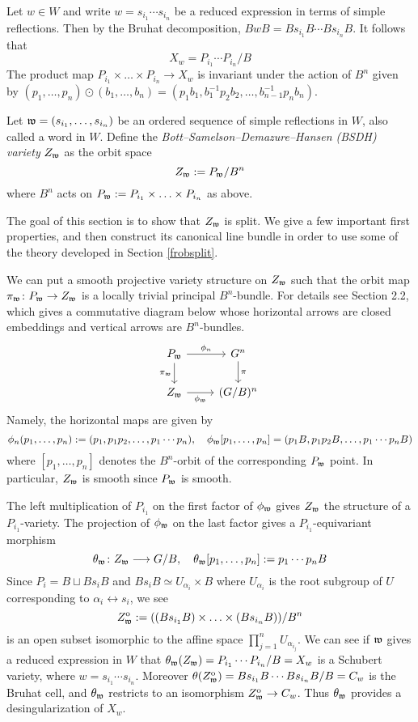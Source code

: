 \documentclass[12pt]{article}
\begin{document}
Let $w \in W$ and write $w = s_{i_1}\cdots s_{i_n}$ be a reduced expression in terms of simple reflections. Then by the Bruhat decomposition, $BwB = Bs_{i_1}B\cdots Bs_{i_n}B$. It follows that
\[X_w = P_{i_1}\cdots P_{i_n}/B\]
The product map $P_{i_1} \times \ldots \times P_{i_n} \to X_w$ is invariant under the action of $B^n$ given by $(p_1,\ldots,p_n) \odot (b_1,\ldots,b_n) = (p_1 b_1, b_1^{-1} p_2 b_2, \ldots, b_{n-1}^{-1} p_n b_n)$.
\begin{defn}
    Let $\mathfrak{w} = (s_{i_1},\ldots,s_{i_n})$ be an ordered sequence of simple reflections in $W$, also called a word in $W$. Define the \textit{Bott–Samelson–Demazure–Hansen (BSDH) variety} $Z_{\mathfrak{w}}$ as the orbit space
    \[Z_{\mathfrak{w}} := P_{\mathfrak{w}}/B^n\]
    where $B^n$ acts on $P_{\mathfrak{w}} := P_{i_1} \times \ldots \times P_{i_n}$ as above.
\end{defn}
The goal of this section is to show that $Z_{\mathfrak{w}}$ is split. We give a few important first properties, and then construct its canonical line bundle in order to use some of the theory developed in Section \ref{frobsplit}.

We can put a smooth projective variety structure on $Z_{\mathfrak{w}}$ such that the orbit map $\pi_{\mathfrak{w}} \colon P_{\mathfrak{w}} \to Z_{\mathfrak{w}}$ is a locally trivial principal $B^n$-bundle. For details see \cite{Brion2004FrobeniusSM} Section 2.2, which gives a commutative diagram below whose horizontal arrows are closed embeddings and vertical arrows are $B^n$-bundles.
\[\begin{tikzcd}
	{P_{\mathfrak{w}}} & {G^n} \\
	{Z_{\mathfrak{w}}} & {(G/B)^n}
	\arrow["{\phi_n}", from=1-1, to=1-2]
	\arrow["{\pi_{\mathfrak{w}}}"', from=1-1, to=2-1]
	\arrow["\pi", from=1-2, to=2-2]
	\arrow["{\phi_{\mathfrak{w}}}"', from=2-1, to=2-2]
\end{tikzcd}\]
Namely, the horizontal maps are given by
\[\phi_n(p_1,\ldots,p_n) := (p_1,p_1p_2,\ldots,p_1\cdots p_n), \quad \phi_{\mathfrak{w}}[p_1,\ldots,p_n]=(p_1B, p_1p_2B, \ldots, p_1\cdots p_n B)\]
where $[p_1,\ldots,p_n]$ denotes the $B^n$-orbit of the corresponding $P_{\mathfrak{w}}$ point. In particular, $Z_{\mathfrak{w}}$ is smooth since $P_{\mathfrak{w}}$ is smooth.

The left multiplication of $P_{i_1}$ on the first factor of $\phi_{\mathfrak{w}}$ gives $Z_{\mathfrak{w}}$ the structure of a $P_{i_1}$-variety. The projection of $\phi_{\mathfrak{w}}$ on the last factor gives a $P_{i_1}$-equivariant morphism 
\[\theta_{\mathfrak{w}} \colon Z_{\mathfrak{w}} \longrightarrow G/B, \quad \theta_{\mathfrak{w}}[p_1,\ldots,p_n] := p_1\cdots p_n B\]
Since $P_i = B \sqcup Bs_i B$ and $Bs_i B \simeq U_{\alpha_i} \times B$ where $U_{\alpha_i}$ is the root subgroup of $U$ corresponding to $\alpha_i \leftrightarrow s_i$, we see
\[Z^{\mathrm{o}}_{\mathfrak{w}} := ((Bs_{i_1}B) \times \ldots \times (B s_{i_n} B))/B^n\]
is an open subset isomorphic to the affine space $\prod_{j=1}^n U_{\alpha_{i_j}}$. We can see if $\mathfrak{w}$ gives a reduced expression in $W$ that $\theta_{\mathfrak{w}}(Z_{\mathfrak{w}}) = P_{i_1}\cdots P_{i_n}/B = X_w$ is a Schubert variety, where $w= s_{i_1}\cdots s_{i_n}$. Moreover $\theta(Z^{\mathrm{o}}_{\mathfrak{w}}) = Bs_{i_1}B\cdots Bs_{i_n} B/B = C_w$ is the Bruhat cell, and $\theta_{\mathfrak{w}}$ restricts to an isomorphism $Z^{\mathrm{o}}_{\mathfrak{w}} \to C_w$. Thus $\theta_{\mathfrak{w}}$ provides a desingularization of $X_w$.
\end{document}
